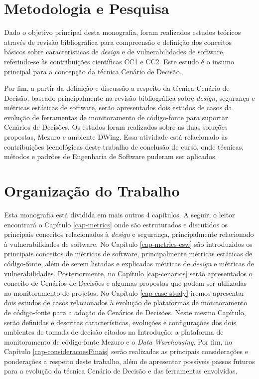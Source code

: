 
\section{Metodologia e Pesquisa}

Dado o objetivo principal desta monografia, foram realizados estudos teóricos através de revisão bibliográfica para compreensão e definição dos conceitos básicos sobre características de \emph{design}  e de vulnerabilidades de software, referindo-se às contribuições científicas CC1 e CC2. Este estudo é o insumo principal para a concepção da técnica Cenário de Decisão.

%

Por fim, a  partir da definição e discussão a respeito da técnica Cenário de Decisão, baseado principalmente na revisão bibliográfica sobre \emph{design}, segurança e métricas estáticas de software, serão apresentados dois estudos de casos da evolução de ferramentas de monitoramento de código-fonte para suportar Cenários de Decisões. Os estudos foram realizados sobre as duas soluções propostas, Mezuro e ambiente DWing.
%
Essa atividade está relacionado às contribuições tecnológicas deste trabalho de conclusão de curso, onde técnicas, métodos e padrões de Engenharia de Software puderam ser aplicados.



\section{Organização do Trabalho}

Esta monografia está dividida em mais outros 4 capítulos. A seguir, o leitor encontrará o Capítulo \ref{cap-metrics} onde são estruturados e discutidos os principais conceitos relacionados à \emph{design} e segurança, principalmente relacionado à vulnerabilidades de software. No Capítulo \ref{cap-metrics-esw} são introduzidos os principais conceitos de métricas de software, principalmente métricas estáticas de código-fonte, além de serem listadas e explicadas métricas de \emph{design} e métricas de vulnerabilidades. Posteriormente, no Capítulo \ref{cap-cenarios}  serão apresentados o conceito de Cenários de Decisões e algumas propostas que podem ser utilizadas no monitoramento de projetos. No Capítulo \ref{cap-case-study} iremos apresentar dois estudos de casos relacionados à evolução de plataformas de monitoramento de código-fonte para a adoção de Cenários de Decisões. Neste mesmo Capítulo, serão definidas e descritas características, evoluções e configurações dos dois ambientes de tomada de decisão citados na Introdução: a plataforma de monitoramento de código-fonte Mezuro e o \emph{Data Warehousing}. Por fim, no Capítulo \ref{cap-consideracoesFinais} serão realizadas as principais considerações e ponderações a respeito deste trabalho, além de apresentar possíveis passos futuros para a evolução da técnica Cenário de Decisão e das ferramentas envolvidas.

